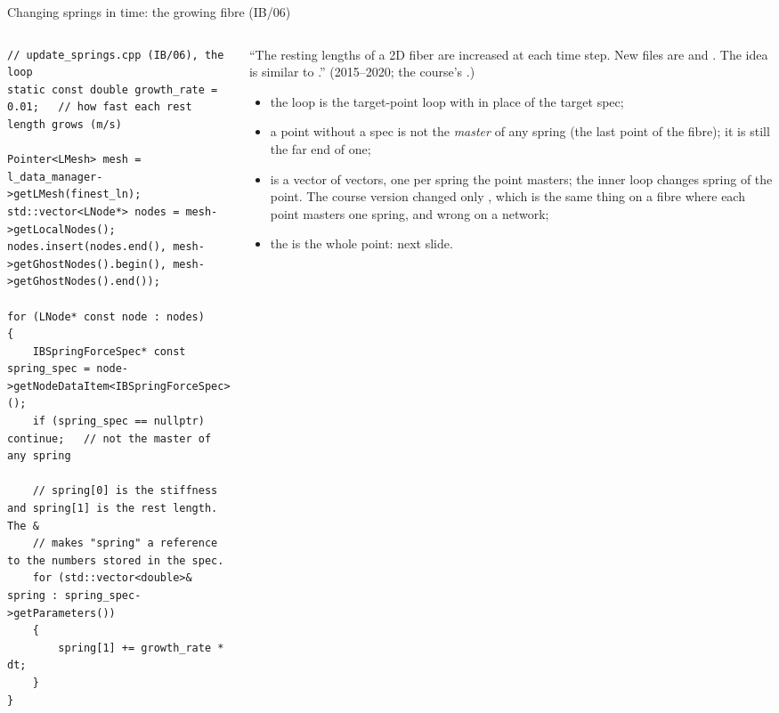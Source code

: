 \documentclass[aspectratio=169,11pt]{beamer}
\begin{document}
\begin{frame}[fragile]{Changing springs in time: the growing fibre (IB/06)}
\label{fr:springs}
\begin{columns}[T,onlytextwidth]
\begin{column}{0.52\textwidth}
\begin{lstlisting}[style=cpptiny]
// update_springs.cpp (IB/06), the loop
static const double growth_rate = 0.01;   // how fast each rest length grows (m/s)

Pointer<LMesh> mesh = l_data_manager->getLMesh(finest_ln);
std::vector<LNode*> nodes = mesh->getLocalNodes();
nodes.insert(nodes.end(), mesh->getGhostNodes().begin(), mesh->getGhostNodes().end());

for (LNode* const node : nodes)
{
    IBSpringForceSpec* const spring_spec = node->getNodeDataItem<IBSpringForceSpec>();
    if (spring_spec == nullptr) continue;   // not the master of any spring

    // spring[0] is the stiffness and spring[1] is the rest length. The &
    // makes "spring" a reference to the numbers stored in the spec.
    for (std::vector<double>& spring : spring_spec->getParameters())
    {
        spring[1] += growth_rate * dt;
    }
}
\end{lstlisting}
\end{column}
\begin{column}{0.46\textwidth}
\scriptsize ``The resting lengths of a 2D fiber are increased at each time step. New files are  and . The idea is similar to .'' (2015--2020; the course's .)
\begin{itemize}
  \item the loop is the target-point loop with  in place of the target spec;
  \item a point without a spec is not the \emph{master} of any spring (the last point of the fibre); it is still the far end of one;
  \item {} is a vector of vectors, one per spring the point masters; the inner loop changes  spring of the point. The course version changed only \code{[0]}, which is the same thing on a fibre where each point masters one spring, and wrong on a network;
  \item the   is the whole point: next slide.
\end{itemize}
\end{column}
\end{columns}
\end{frame}
\end{document}
